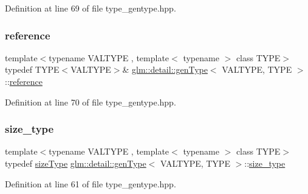 Definition at line 69 of file type\+\_\+gentype.\+hpp.

\mbox{\label{structglm_1_1detail_1_1gen_type_a14792cf03ce9cfb37becd2da5d9ae06a}} 
\subsubsection{\texorpdfstring{reference}{reference}}
{\footnotesize\ttfamily template$<$typename V\+A\+L\+T\+Y\+PE , template$<$ typename $>$ class T\+Y\+PE$>$ \\
typedef T\+Y\+PE$<$V\+A\+L\+T\+Y\+PE$>$\& \hyperlink{structglm_1_1detail_1_1gen_type}{glm\+::detail\+::gen\+Type}$<$ V\+A\+L\+T\+Y\+PE, T\+Y\+PE $>$\+::\hyperlink{structglm_1_1detail_1_1gen_type_a14792cf03ce9cfb37becd2da5d9ae06a}{reference}}



Definition at line 70 of file type\+\_\+gentype.\+hpp.

\mbox{\label{structglm_1_1detail_1_1gen_type_af4fa06eb65eebb96960fae19a3b439eb}} 
\subsubsection{\texorpdfstring{size\+\_\+type}{size\_type}}
{\footnotesize\ttfamily template$<$typename V\+A\+L\+T\+Y\+PE , template$<$ typename $>$ class T\+Y\+PE$>$ \\
typedef \hyperlink{namespaceglm_ae49d80f7bfe4be96585fe8f1d3431cc6}{size\+Type} \hyperlink{structglm_1_1detail_1_1gen_type}{glm\+::detail\+::gen\+Type}$<$ V\+A\+L\+T\+Y\+PE, T\+Y\+PE $>$\+::\hyperlink{structglm_1_1detail_1_1gen_type_af4fa06eb65eebb96960fae19a3b439eb}{size\+\_\+type}}



Definition at line 61 of file type\+\_\+gentype.\+hpp.

\mbox{\label{structglm_1_1detail_1_1gen_type_a17dbd44c7a86d09e6ea05b72cb02bccf}} 
